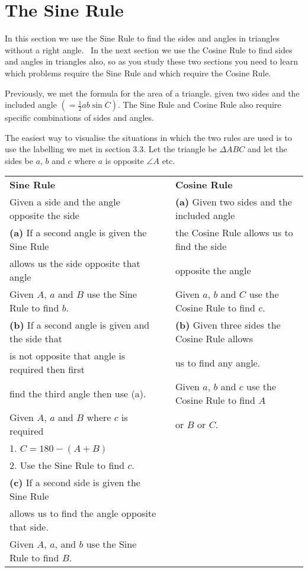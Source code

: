 \section{The Sine Rule}


In this section we use the Sine Rule to find the sides and angles in triangles without a right angle.
\ In the next section we use the Cosine Rule to find sides and angles in triangles also, so as you study these
two sections you need to learn which problems require the Sine Rule and which require the Cosine Rule. 

Previously, we met the formula
for the area of a triangle. given two sides and the included angle $\left ( =\frac{1}{2} a b \sin  C\right )$. The Sine Rule and
Cosine Rule also require specific combinations of sides and angles. 

The easiest way to visualise the situations in which the two rules
are used is to use the labelling we met in section $3.3$. Let the triangle be $ \Delta A B C$ and let the sides be $a$, $b$ and $c$ where $a$ is opposite $\angle A$ etc. 

   
\setlength\fboxrule{0in}\setlength\fboxsep{0.2in}



\begin{tabular}[c]{lll}\textbf{Sine Rule}  &  & \textbf{Cosine
Rule}  \\
 Given a side and the angle opposite the side  &  & \textbf{(a)}
Given two sides and the included angle  \\
 \textbf{(a)} If a second angle is
given the Sine Rule  &  & the Cosine Rule allows us to find the
side  \\
allows us the side opposite that angle  &  & opposite
the angle  \\
Given $A$, $a$ and $B$ use the Sine Rule to find $b\text{.}$  &  & Given $a$, $b$ and $C$ use the Cosine Rule to find $c\text{.}$  \\
 \textbf{(b)} If a second
angle is given and the side that  &  & \textbf{(b)} Given three
sides the Cosine Rule allows  \\
is not opposite that angle is required then first  &  & us
to find any angle.  \\
find the third angle then use (a).  &  & Given
$a$, $b$ and $c$ use the Cosine Rule to find $A$  \\
Given $A$, $a$ and $B$ where $c$ is required  &  & or $B$ or $C$.  \\
 1. $C =180 -(A +B)$  &  &  \\
2.
Use the Sine Rule to find $c$.  &  &  \\
\textbf{(c)} If a second side is given the Sine Rule  &  &  \\
allows
us to find the angle opposite that side.  &  &  \\
Given
$A$, $a$, and $b$ use the Sine Rule to find $B$.  &  &  \\
\end{tabular}

